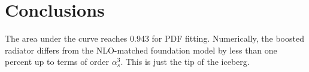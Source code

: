 \section{Conclusions}\label{sec:conclusions}

The area under the curve reaches 0.943 for PDF fitting. Numerically, the
boosted radiator differs from the NLO-matched foundation model by less
than one percent up to terms of order $\alpha_s^3$. This is just the tip
of the iceberg.

